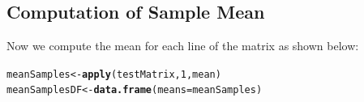 \documentclass[a4paper, 12pt]{article}\usepackage[]{graphicx}\usepackage[]{color}
\makeatletter
\newcommand{\hlnum}[1]{\textcolor[rgb]{0.686,0.059,0.569}{#1}}%
\newcommand{\hlstd}[1]{\textcolor[rgb]{0.345,0.345,0.345}{#1}}%
\newcommand{\hlkwb}[1]{\textcolor[rgb]{0.69,0.353,0.396}{#1}}%
\newcommand{\hlkwc}[1]{\textcolor[rgb]{0.333,0.667,0.333}{#1}}%
\newcommand{\hlkwd}[1]{\textcolor[rgb]{0.737,0.353,0.396}{\textbf{#1}}}%
\newenvironment{kframe}{%
 \def\at@end@of@kframe{}%
 \ifinner\ifhmode%
  \def\at@end@of@kframe{\end{minipage}}%
  \begin{minipage}{\columnwidth}%
 \fi\fi%
 \def\FrameCommand##1{\hskip\@totalleftmargin \hskip-\fboxsep
 \colorbox{shadecolor}{##1}\hskip-\fboxsep
     \hskip-\linewidth \hskip-\@totalleftmargin \hskip\columnwidth}%
 \MakeFramed {\advance\hsize-\width
   \@totalleftmargin\z@ \linewidth\hsize
   \@setminipage}}%
 {\par\unskip\endMakeFramed%
 \at@end@of@kframe}
\newenvironment{knitrout}{}{} %
\makeatother
\begin{document}
 \subsection{Computation of Sample Mean}
		Now we compute the mean for each line of the matrix as shown below:
\begin{knitrout}\small
{}\color{fgcolor}\begin{kframe}
\begin{alltt}
\hlstd{meanSamples} \hlkwb{<-} \hlkwd{apply}\hlstd{(testMatrix,}\hlnum{1}\hlstd{,mean)}
\hlstd{meanSamplesDF} \hlkwb{<-} \hlkwd{data.frame}\hlstd{(}\hlkwc{means} \hlstd{= meanSamples)}
\end{alltt}
\end{kframe}
\end{knitrout}
\end{document}
